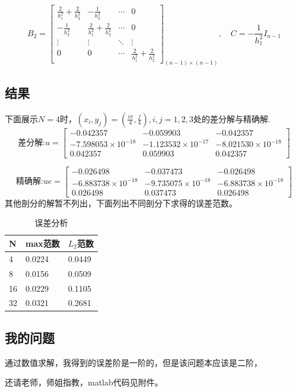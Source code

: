 \documentclass[12pt,a4paper]{article}
\begin{document}
\begin{equation}
 B_2 = \left[                 
\begin{array}{cccc}
\frac{2}{h_1^2}+\frac{2}{h_2^2}& -\frac{1}{h_2^2} &\cdots  & 0\\
-\frac{1}{h_2^2}& \frac{2}{h_1^2}+\frac{2}{h_2^2} &\cdots& 0\\
\vdots  & \vdots & \ddots & \vdots \\
0& 0 &\cdots  &\frac{2}{h_1^2}+\frac{2}{h_2^2}
\end{array}
\right ]_{(n-1) \times (n-1)} ,\quad C = -\frac{1}{h_1^2} I_{n-1}
\end{equation}

\subsection{结果}
下面展示$N = 4$时，$(x_i,y_j)=(\frac{i\pi}{4},\frac{j}{4}),i,j=1,2,3$处的差分解与精确解.
\begin{equation}
\text{差分解:}u = \left[                 
\begin{array}{ccc}
-0.042357& -0.059903 & -0.042357\\
-7.598053\times 10^{-18}& -1.123532\times 10^{-17} & -8.021530 \times 10^{-18}\\
0.042357& 0.059903 & 0.042357
\end{array}
\right ]
\end{equation}

\begin{equation}
\text{精确解:}ue = \left[                 
\begin{array}{ccc}
-0.026498& -0.037473 & -0.026498\\
-6.883738\times 10^{-18}& -9.735075\times 10^{-18} & -6.883738\times 10^{-18}\\
0.026498& 0.037473 & 0.026498
\end{array}
\right ]
\end{equation}
\newpage
其他剖分的解暂不列出，下面列出不同剖分下求得的误差范数。

\begin{table}
	\centering  
	\caption{误差分析}  
	\begin{tabular*}{6cm}{lll}  
		\hline  
		N & max范数  & $L_2$范数 \\  
		\hline  
		4  & 0.0224 & 0.0449  \\  
		8  & 0.0156 & 0.0509  \\
		16  & 0.0229 & 0.1105 \\
		32  & 0.0321 & 0.2681 \\  
		\hline  
	\end{tabular*}  
\end{table}

\subsection{我的问题}
通过数值求解，我得到的误差阶是一阶的，但是该问题本应该是二阶，

还请老师，师姐指教，matlab代码见附件。
\end{document}

